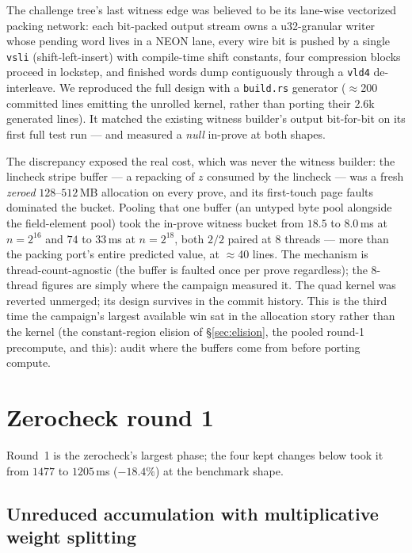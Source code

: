 \documentclass[11pt]{article}
\newcommand{\code}[1]{\texttt{#1}}
\begin{document}
The challenge tree's last witness edge was believed to be its lane-wise
vectorized packing network: each bit-packed output stream owns a
u32-granular writer whose pending word lives in a NEON lane, every wire
bit is pushed by a single \code{vsli} (shift-left-insert) with
compile-time shift constants, four compression blocks proceed in
lockstep, and finished words dump contiguously through a
\code{vld4} de-interleave. We reproduced the full design with a
\code{build.rs} generator ($\approx$200 committed lines emitting the
unrolled kernel, rather than porting their $2.6$k generated lines). It
matched the existing witness builder's output bit-for-bit on its first
full test run --- and measured a \emph{null} in-prove at both shapes.

The discrepancy exposed the real cost, which was never the witness builder: the
lincheck stripe buffer --- a repacking of $z$ consumed by the lincheck
--- was a fresh \emph{zeroed} $128$--$512$\,MB allocation on every
prove, and its first-touch page faults dominated the bucket. Pooling
that one buffer (an untyped byte pool alongside the field-element pool)
took the in-prove witness bucket from $18.5$ to $8.0$\,ms at $n=2^{16}$
and $74$ to $33$\,ms at $n=2^{18}$, both $2/2$ paired at 8 threads ---
more than the packing port's entire predicted value, at $\approx$40
lines. The mechanism is thread-count-agnostic (the buffer is faulted
once per prove regardless); the 8-thread figures are simply where the
campaign measured it. The quad kernel was reverted unmerged; its design
survives in the commit history. This is the third time the campaign's
largest available win sat in the allocation story rather than the
kernel (the constant-region elision of \S\ref{sec:elision}, the pooled
round-1 precompute, and this): audit where the buffers come from before
porting compute.

\section{Zerocheck round 1}

Round~1 is the zerocheck's largest phase; the four kept changes below took it
from $1477$ to $1205$\,ms ($-18.4\%$) at the benchmark shape.

\subsection{Unreduced accumulation with multiplicative weight splitting}
\label{sec:pmull}
\end{document}

